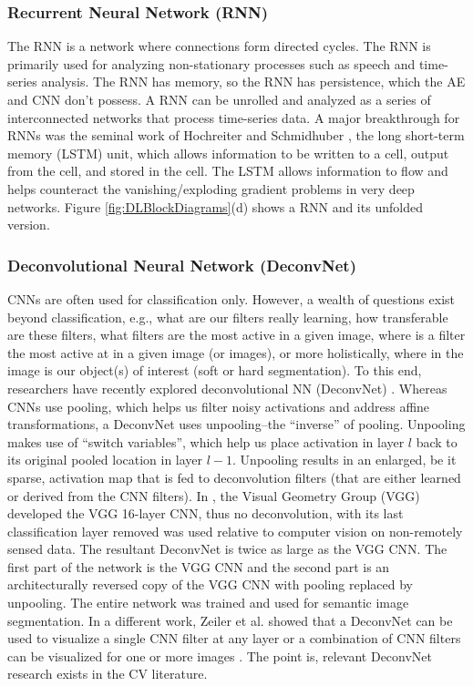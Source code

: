 \documentclass[12pt]{spieman}
\begin{document}
\begin{spacing}{1}
\subsubsection{Recurrent Neural Network (RNN)}
The RNN is a network where connections form directed cycles. The RNN is primarily used for analyzing non-stationary processes such as speech and time-series analysis. The RNN has memory, so the RNN has persistence, which the AE and CNN don't possess. A RNN can be unrolled and analyzed as a series of interconnected networks that process time-series data. A major breakthrough for RNNs was the seminal work of Hochreiter and Schmidhuber \cite{hochreiter1997long} , the long short-term memory (LSTM) unit, which allows information to be written to a cell, output from the cell, and stored in the cell. The LSTM allows information to flow and helps counteract the vanishing/exploding gradient problems in very deep networks. Figure \ref{fig:DLBlockDiagrams}(d) shows a RNN and its unfolded version.

\subsubsection{Deconvolutional Neural Network (DeconvNet)}
CNNs are often used for classification only. However, a wealth of questions exist beyond classification, e.g., what are our filters really learning, how transferable are these filters, what filters are the most active in a given image, where is a filter the most active at in a given image (or images), or more holistically, where in the image is our object(s) of interest (soft or hard segmentation). To this end, researchers have recently explored deconvolutional NN (DeconvNet) \cite{zeiler2014visualizing,6126474,Zeiler10deconvolutionalnetworks,DBLP:journals/corr/NohHH15} . Whereas CNNs use pooling, which helps us filter noisy activations and address affine transformations, a DeconvNet uses unpooling--the ``inverse'' of pooling. Unpooling makes use of ``switch variables'', which help us place activation in layer $l$ back to its original pooled location in layer $l-1$. Unpooling results in an enlarged, be it sparse, activation map that is fed to deconvolution filters (that are either learned or derived from the CNN filters). In \cite{DBLP:journals/corr/NohHH15} , the Visual Geometry Group (VGG) developed the VGG 16-layer CNN, thus no deconvolution, with its last classification layer removed was used relative to computer vision on non-remotely sensed data. The resultant DeconvNet is twice as large as the VGG CNN. The first part of the network is the VGG CNN and the second part is an architecturally reversed copy of the VGG CNN with pooling replaced by unpooling. The entire network was trained and used for semantic image segmentation. In a different work, Zeiler et al. showed that a DeconvNet can be used to visualize a single CNN filter at any layer or a combination of CNN filters can be visualized for one or more images \cite{6126474,zeiler2014visualizing} . The point is, relevant DeconvNet research exists in the CV literature.


\end{spacing}
\end{document}
